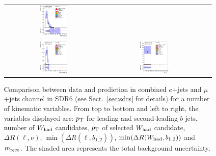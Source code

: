 \begin{figure}[htbp]
\begin{center}
\begin{tabular}{ccc}
\includegraphics[width=0.30\textwidth]{appendices/figures/sdrs/VLQAna_WbX_MinDRlb_ELEMUONCR6_1W_NOMINAL.eps} \\
\includegraphics[width=0.30\textwidth]{appendices/figures/sdrs/VLQAna_WbX_MinDRWb_ELEMUONCR6_1W_NOMINAL.eps} &
\includegraphics[width=0.30\textwidth]{appendices/figures/sdrs/VLQAna_WbX_1W_MWb_4_ELEMUONCR6_1W_NOMINAL.eps} & \\
\end{tabular}\caption{\small {Comparison between data and prediction in combined $e$+jets and $\mu$+jets channel in SDR6 (see Sect.~\ref{sec:sdrs} for details) 
for a number of kinematic variables. From top to bottom and left to right, the variables displayed are: $\pt$ for leading and second-leading $b$ jets,
number of $W_{\rm had}$  candidates, $\pt$ of selected $W_{\rm had}$  candidate, $\Delta R(\ell,\nu)$, $\min(\Delta R(\ell, b_{1,2}))$, 
$\min(\Delta R(W_{\rm had}, b_{1,2}))$ and $m_{\rm reco}$.
The shaded area represents the total background uncertainty.}}
\label{fig:ELEMUONCR6_3}
\end{center}
\end{figure}                                                                             
